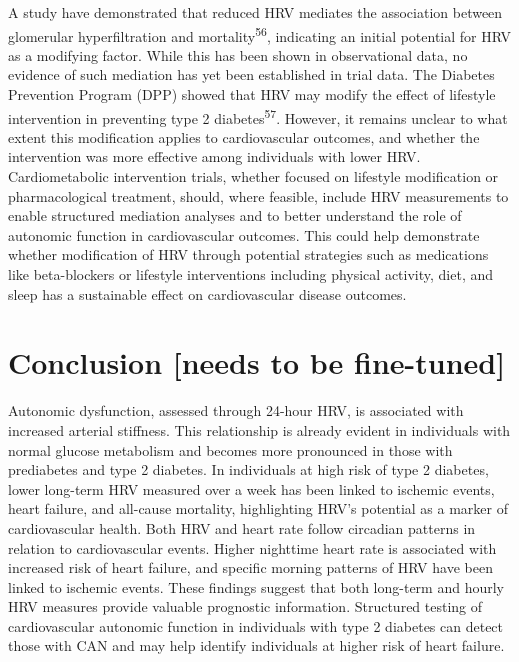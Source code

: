 \documentclass[
  a4paper,
  headsepline=true,
  open=any]{scrbook}
\begin{document}
A study have demonstrated that reduced HRV mediates the association
between glomerular hyperfiltration and mortality\textsuperscript{56},
indicating an initial potential for HRV as a modifying factor. While
this has been shown in observational data, no evidence of such mediation
has yet been established in trial data. The Diabetes Prevention Program
(DPP) showed that HRV may modify the effect of lifestyle intervention in
preventing type 2 diabetes\textsuperscript{57}. However, it remains
unclear to what extent this modification applies to cardiovascular
outcomes, and whether the intervention was more effective among
individuals with lower HRV. Cardiometabolic intervention trials, whether
focused on lifestyle modification or pharmacological treatment, should,
where feasible, include HRV measurements to enable structured mediation
analyses and to better understand the role of autonomic function in
cardiovascular outcomes. This could help demonstrate whether
modification of HRV through potential strategies such as medications
like beta-blockers or lifestyle interventions including physical
activity, diet, and sleep has a sustainable effect on cardiovascular
disease outcomes.


\hypertarget{conclusion-needs-to-be-fine-tuned}{%
\chapter{Conclusion {[}needs to be
fine-tuned{]}}\label{conclusion-needs-to-be-fine-tuned}}

Autonomic dysfunction, assessed through 24-hour HRV, is associated with
increased arterial stiffness. This relationship is already evident in
individuals with normal glucose metabolism and becomes more pronounced
in those with prediabetes and type 2 diabetes. In individuals at high
risk of type 2 diabetes, lower long-term HRV measured over a week has
been linked to ischemic events, heart failure, and all-cause mortality,
highlighting HRV's potential as a marker of cardiovascular health. Both
HRV and heart rate follow circadian patterns in relation to
cardiovascular events. Higher nighttime heart rate is associated with
increased risk of heart failure, and specific morning patterns of HRV
have been linked to ischemic events. These findings suggest that both
long-term and hourly HRV measures provide valuable prognostic
information. Structured testing of cardiovascular autonomic function in
individuals with type 2 diabetes can detect those with CAN and may help
identify individuals at higher risk of heart failure.
\end{document}

